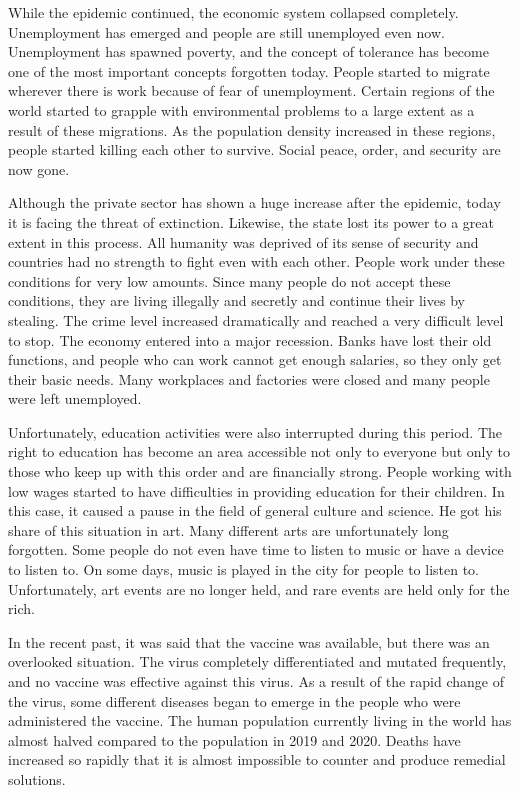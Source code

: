 \documentclass[]{book}
\begin{document}
While the epidemic continued, the economic system collapsed completely. Unemployment has emerged and people are still unemployed even now. Unemployment has spawned poverty, and the concept of tolerance has become one of the most important concepts forgotten today. People started to migrate wherever there is work because of fear of unemployment. Certain regions of the world started to grapple with environmental problems to a large extent as a result of these migrations. As the population density increased in these regions, people started killing each other to survive. Social peace, order, and security are now gone.

Although the private sector has shown a huge increase after the epidemic, today it is facing the threat of extinction. Likewise, the state lost its power to a great extent in this process. All humanity was deprived of its sense of security and countries had no strength to fight even with each other. People work under these conditions for very low amounts. Since many people do not accept these conditions, they are living illegally and secretly and continue their lives by stealing. The crime level increased dramatically and reached a very difficult level to stop. The economy entered into a major recession. Banks have lost their old functions, and people who can work cannot get enough salaries, so they only get their basic needs. Many workplaces and factories were closed and many people were left unemployed.

Unfortunately, education activities were also interrupted during this period. The right to education has become an area accessible not only to everyone but only to those who keep up with this order and are financially strong. People working with low wages started to have difficulties in providing education for their children. In this case, it caused a pause in the field of general culture and science. He got his share of this situation in art. Many different arts are unfortunately long forgotten. Some people do not even have time to listen to music or have a device to listen to. On some days, music is played in the city for people to listen to. Unfortunately, art events are no longer held, and rare events are held only for the rich.

In the recent past, it was said that the vaccine was available, but there was an overlooked situation. The virus completely differentiated and mutated frequently, and no vaccine was effective against this virus. As a result of the rapid change of the virus, some different diseases began to emerge in the people who were administered the vaccine. The human population currently living in the world has almost halved compared to the population in 2019 and 2020. Deaths have increased so rapidly that it is almost impossible to counter and produce remedial solutions.
\end{document}
